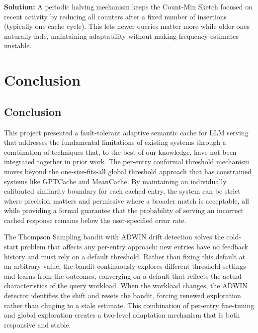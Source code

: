 \documentclass[12pt,a4paper]{report}
\begin{document}
\textbf{Solution:} A periodic halving mechanism keeps the Count-Min Sketch focused on recent activity by reducing all counters after a fixed number of insertions (typically one cache cycle). This lets newer queries matter more while older ones naturally fade, maintaining adaptability without making frequency estimates unstable.





\chapter{Conclusion}

\section{Conclusion}

This project presented a fault-tolerant adaptive semantic cache for LLM serving that addresses the fundamental limitations of existing systems through a combination of techniques that, to the best of our knowledge, have not been integrated together in prior work. The per-entry conformal threshold mechanism moves beyond the one-size-fits-all global threshold approach that has constrained systems like GPTCache and MeanCache. By maintaining an individually calibrated similarity boundary for each cached entry, the system can be strict where precision matters and permissive where a broader match is acceptable, all while providing a formal guarantee that the probability of serving an incorrect cached response remains below the user-specified error rate.

The Thompson Sampling bandit with ADWIN drift detection solves the cold-start problem that affects any per-entry approach: new entries have no feedback history and must rely on a default threshold. Rather than fixing this default at an arbitrary value, the bandit continuously explores different threshold settings and learns from the outcomes, converging on a default that reflects the actual characteristics of the query workload. When the workload changes, the ADWIN detector identifies the shift and resets the bandit, forcing renewed exploration rather than clinging to a stale estimate. This combination of per-entry fine-tuning and global exploration creates a two-level adaptation mechanism that is both responsive and stable.
\end{document}

